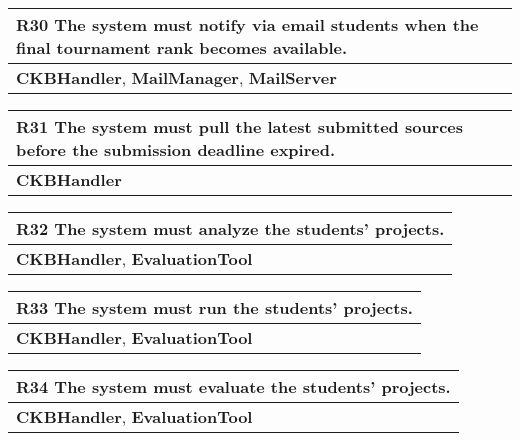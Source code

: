 \begin{table}[H]
    \begin{tabularx}{\textwidth}{X}
        \toprule
        \textbf{R30} The system must notify via email students when the final tournament rank becomes available. \\ \midrule
        \textbf{CKBHandler}, \textbf{MailManager}, \textbf{MailServer} \\    
    \end{tabularx}
\end{table}

\begin{table}[H]
    \begin{tabularx}{\textwidth}{X}
        \toprule
        \textbf{R31} The system must pull the latest submitted sources before the submission deadline expired. \\ \midrule
        \textbf{CKBHandler}                    \\
    \end{tabularx}
\end{table}

\begin{table}[H]
    \begin{tabularx}{\textwidth}{X}
        \toprule
        \textbf{R32} The system must analyze the students' projects. \\ \midrule
        \textbf{CKBHandler}, \textbf{EvaluationTool}  \\
    \end{tabularx}
\end{table}

\begin{table}[H]
    \begin{tabularx}{\textwidth}{X}
        \toprule
        \textbf{R33} The system must run the students' projects. \\ \midrule
        \textbf{CKBHandler}, \textbf{EvaluationTool}                     \\  
    \end{tabularx}
\end{table}

\begin{table}[H]
    \begin{tabularx}{\textwidth}{X}
        \toprule
        \textbf{R34} The system must evaluate the students' projects. \\ \midrule
        \textbf{CKBHandler}, \textbf{EvaluationTool}                     \\
    \end{tabularx}
\end{table}

